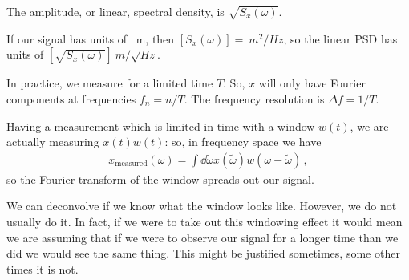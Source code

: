 \documentclass[main.tex]{subfiles}
\begin{document}
The amplitude, or linear, spectral density, is \(\sqrt{S_x(\omega )}\). 

If our signal has units of \SI{}{m}, then \([S_x(\omega )] = \SI{}{m^2/Hz}\), so the linear PSD has units of \([\sqrt{S_x(\omega )}] \SI{}{m / \sqrt{Hz}}\).

In practice, we measure for a limited time \(T\). So, \(x\) will only have Fourier components at frequencies \(f_n = n / T\). The frequency resolution is \(\Delta f = 1 / T\). 

Having a measurement which is limited in time with a window \(w(t)\), we are actually measuring \(x(t) w(t)\): so, in frequency space we have 
%
\begin{align}
x _{\text{measured}} (\omega ) = \int \dd{\widetilde{\omega}} x(\widetilde{\omega}) w(\omega - \widetilde{\omega} ) 
\,,
\end{align}
%
so the Fourier transform of the window spreads out our signal.

We can deconvolve if we know what the window looks like. However, we do not usually do it. 
In fact, if we were to take out this windowing effect it would mean we are assuming that if we were to observe our signal for a longer time than we did we would see the same thing.
This might be justified sometimes, some other times it is not.
\end{document}

